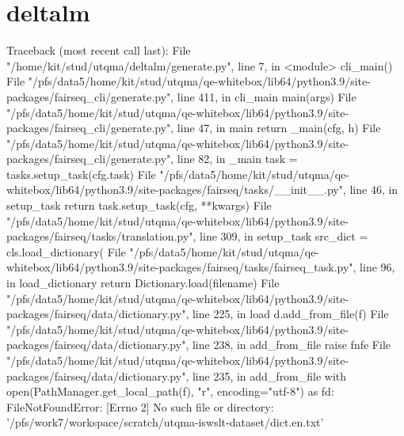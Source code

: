 \section{deltalm}
Traceback (most recent call last):
  File "/home/kit/stud/utqma/deltalm/generate.py", line 7, in <module>
    cli_main()
  File "/pfs/data5/home/kit/stud/utqma/qe-whitebox/lib64/python3.9/site-packages/fairseq_cli/generate.py", line 411, in cli_main
    main(args)
  File "/pfs/data5/home/kit/stud/utqma/qe-whitebox/lib64/python3.9/site-packages/fairseq_cli/generate.py", line 47, in main
    return _main(cfg, h)
  File "/pfs/data5/home/kit/stud/utqma/qe-whitebox/lib64/python3.9/site-packages/fairseq_cli/generate.py", line 82, in _main
    task = tasks.setup_task(cfg.task)
  File "/pfs/data5/home/kit/stud/utqma/qe-whitebox/lib64/python3.9/site-packages/fairseq/tasks/__init__.py", line 46, in setup_task
    return task.setup_task(cfg, **kwargs)
  File "/pfs/data5/home/kit/stud/utqma/qe-whitebox/lib64/python3.9/site-packages/fairseq/tasks/translation.py", line 309, in setup_task
    src_dict = cls.load_dictionary(
  File "/pfs/data5/home/kit/stud/utqma/qe-whitebox/lib64/python3.9/site-packages/fairseq/tasks/fairseq_task.py", line 96, in load_dictionary
    return Dictionary.load(filename)
  File "/pfs/data5/home/kit/stud/utqma/qe-whitebox/lib64/python3.9/site-packages/fairseq/data/dictionary.py", line 225, in load
    d.add_from_file(f)
  File "/pfs/data5/home/kit/stud/utqma/qe-whitebox/lib64/python3.9/site-packages/fairseq/data/dictionary.py", line
238, in add_from_file
    raise fnfe
  File "/pfs/data5/home/kit/stud/utqma/qe-whitebox/lib64/python3.9/site-packages/fairseq/data/dictionary.py", line 235, in add_from_file
    with open(PathManager.get_local_path(f), "r", encoding="utf-8") as fd:
FileNotFoundError: [Errno 2] No such file or directory: '/pfs/work7/workspace/scratch/utqma-iswslt-dataset/dict.en.txt'



